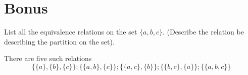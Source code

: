 \begin{questions}
\begin{solution}
	\end{solution}

\section*{Bonus}


\bonusquestion[2] List all the equivalence relations on the set $\{a, b, c\}$.  (Describe the relation be describing the partition on the set).
    \ifprintanswers
        \vspace{-10pt}
    \fi
    \begin{solution}
    There are five such relations
    \[ \{ \{a\}, \{b\}, \{c\} \}; \{ \{a, b\}, \{c\} \}; \{ \{a, c\}, \{b\} \}; 
        \{ \{b, c\}, \{a\} \};  \{ \{a, b, c\} \} \]
    \end{solution}

\end{questions}


